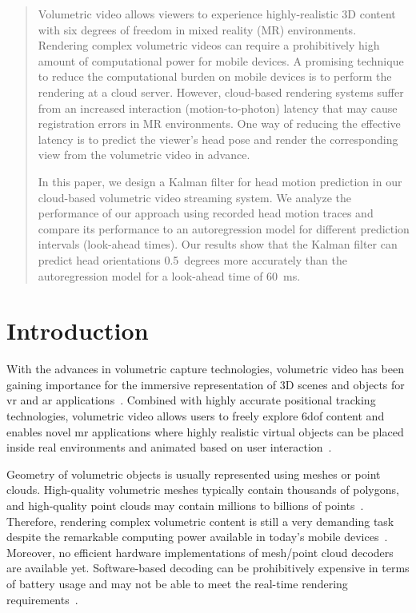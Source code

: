 \documentclass[sigconf]{acmart}			%
\begin{document}
\begin{abstract}	
Volumetric video allows viewers to experience highly-realistic 3D content with six degrees of freedom in mixed reality (MR) environments.
Rendering complex volumetric videos can require a prohibitively high amount of computational power for mobile devices.
A promising technique to reduce the computational burden on mobile devices is to perform the rendering at a cloud server.
However, cloud-based rendering systems suffer from an increased interaction (motion-to-photon) latency that may cause registration errors in MR environments.
One way of reducing the effective latency is to predict the viewer's head pose and render the corresponding view from the volumetric video in advance.

In this paper, we design a Kalman filter for head motion prediction in our cloud-based volumetric video streaming system.
We analyze the performance of our approach using recorded head motion traces and compare its performance to an autoregression model for different prediction intervals (look-ahead times).
Our results show that the Kalman filter can predict head orientations \SI{0.5}{degrees} more accurately than the autoregression model for a look-ahead time of \SI{60}{ms}.
\end{abstract}

\maketitle


\section{Introduction}
\label{sec:intro}
With the advances in volumetric capture technologies, volumetric video has been gaining importance for the immersive representation of 3D scenes and objects for \gls{vr} and \gls{ar} applications~\cite{schreer2019icip}.
Combined with highly accurate positional tracking technologies, volumetric video allows users to freely explore \gls{6dof} content and enables novel \gls{mr} applications where highly realistic virtual objects can be placed inside real environments and animated based on user interaction~\cite{eisert2020}.

Geometry of volumetric objects is usually represented using meshes or point clouds.
High-quality volumetric meshes typically contain thousands of polygons, and high-quality point clouds may contain millions to billions of points~\cite{schreer2019, schwarz2019}.
Therefore, rendering complex volumetric content is still a very demanding task despite the remarkable computing power available in today's mobile devices~\cite{clemm2020}.
Moreover, no efficient hardware implementations of mesh/point cloud decoders are available yet. 
Software-based decoding can be prohibitively expensive in terms of battery usage and may not be able to meet the real-time rendering requirements~\cite{qian2019}.
\end{document}
